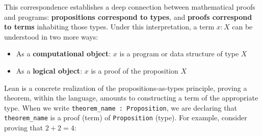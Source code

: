 This correspondence establishes a deep connection between mathematical proofs and programs: 
\textbf{propositions correspond to types}, and \textbf{proofs correspond to terms} inhabiting those types. 
Under this interpretation, a term $x : X$ can be understood in two more ways:
\begin{itemize}
    \item As a \textbf{computational object}: $x$ is a program or data structure of type $X$
    \item As a \textbf{logical object}: $x$ is a proof of the proposition $X$
\end{itemize}
Lean is a concrete realization of the propositions-as-types principle, 
proving a theorem, within the language, amounts to constructing a term of the appropriate type. 
When we write \lstinline[language=lean]|theorem_name : Proposition|, we are declaring that 
\lstinline[language=lean]|theorem_name| is a proof (term) of \lstinline[language=lean]|Proposition| (type). 
For example, consider proving that $2 + 2 = 4$:

